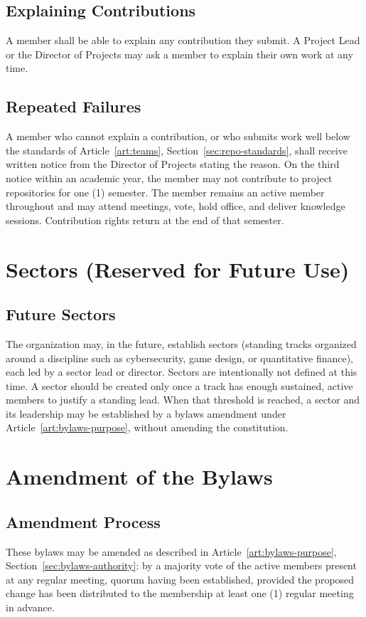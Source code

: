 \documentclass[12pt,letterpaper]{article} %
\begin{document}
\subsection{Explaining Contributions}\label{sec:ai-explanation}
A member shall be able to explain any contribution they submit. A Project Lead or the Director
of Projects may ask a member to explain their own work at any time.
\subsection{Repeated Failures}\label{sec:ai-failures}
A member who cannot explain a contribution, or who submits work well below the standards of
Article~\ref{art:teams}, Section~\ref{sec:repo-standards}, shall receive written notice from the
Director of Projects stating the reason. On the third notice within an academic year, the member
may not contribute to project repositories for one (1) semester. The member remains an active
member throughout and may attend meetings, vote, hold office, and deliver knowledge sessions.
Contribution rights return at the end of that semester.

\section{Sectors (Reserved for Future Use)}\label{art:sectors}
\subsection{Future Sectors}\label{sec:future-sectors}
The organization may, in the future, establish sectors (standing tracks organized around a
discipline such as cybersecurity, game design, or quantitative finance), each led by a sector
lead or director. Sectors are intentionally not defined at this time. A sector should be
created only once a track has enough sustained, active members to justify a standing lead. When
that threshold is reached, a sector and its leadership may be established by a bylaws amendment
under Article~\ref{art:bylaws-purpose}, without amending the constitution.

\section{Amendment of the Bylaws}\label{art:bylaws-amendment}
\subsection{Amendment Process}\label{sec:amendment-process}
These bylaws may be amended as described in Article~\ref{art:bylaws-purpose},
Section~\ref{sec:bylaws-authority}: by a majority vote of the active members present at any
regular meeting, quorum having been established, provided the proposed change has been
distributed to the membership at least one (1) regular meeting in advance.
\end{document}
